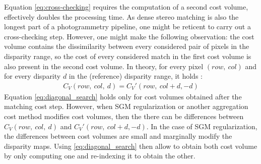 \begin{remark}
     Equation \eqref{eq:cross-checking} requires the computation of a second cost volume, effectively doubles the processing time. As dense stereo matching is also the longest part of a photogrammetry pipeline, one might be reticent to carry out a cross-checking step. However, one might make the following observation: the cost volume contains the dissimilarity between every considered pair of pixels in the disparity range, so the cost of every considered match in the first cost volume is also present in the second cost volume. In theory, for every pixel $(row, ~col)$ and for every disparity $d$ in the (reference) disparity range, it holds \cite{bebis_mutual_2008}:
     \begin{align}\label{eq:diagonal_search}
         C_V(row,~col,~d) = C_V'(row,~col+d, -d)
     \end{align}
     Equation \eqref{eq:diagonal_search} holds only for cost volumes obtained after the matching cost step. However, when SGM regularization or another aggregation cost method modifies cost volumes, then the there can be differences between $C_V(row,~col,~d)$ and $C_V'(row,~col+d, -d)$. In the case of SGM regularization, the differences between cost volumes are small and marginally modify the disparity maps. Using \eqref{eq:diagonal_search} then allow to obtain both cost volume by only computing one and re-indexing it to obtain the other. 
\end{remark}

